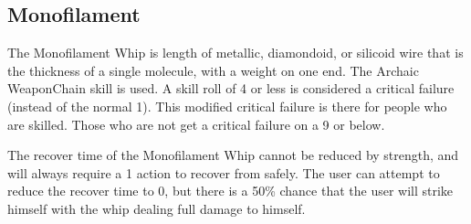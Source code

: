 \documentclass[twoside]{book}
\begin{document}
\begin{multicols}{2}
    \hspace{-2ex}


\vspace{1ex}


    \hspace{-2ex}


\vspace{1ex}


    \hspace{-2ex}


\vspace{1ex}


    
\end{multicols}
  
    

\subsection{Monofilament}
    
    {  
      The Monofilament Whip is length of metallic,
               diamondoid, or silicoid wire that is the thickness of a
               single molecule, with a weight on one end. The Archaic
               WeaponChain skill is used. A skill roll of 4 or
               less is considered a critical failure (instead of the
               normal 1). This modified critical failure is there for
               people who are skilled. Those who are not get a critical
               failure on a 9 or below. 
    }
  
    {  
      The recover time of the Monofilament Whip cannot be
               reduced by strength, and will always require a 1 action to
               recover from safely. The user can attempt to reduce the
               recover time to 0, but there is a 50\% chance that the user
               will strike himself with the whip dealing full damage to
               himself. 
    }
  
\end{document}
